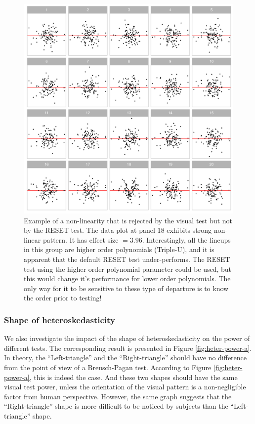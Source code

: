 \documentclass[]{interact}
\theoremstyle{plain}%
\theoremstyle{definition}
\theoremstyle{remark}
\begin{document}
\begin{figure}

{\centering \includegraphics[width=1\linewidth]{paper_comparison_files/figure-latex/poly-example-1} 

}

\caption{Example of a non-linearity that is rejected by the visual test but not by the RESET test. The data plot at panel 18 exhibits strong non-linear pattern. It has effect size $= 3.96$. Interestingly, all the lineups in this group are higher order polynomials (Triple-U), and it is apparent that the default RESET test under-performs. The RESET test using the higher order polynomial parameter could be used, but this would change it's performance for lower order polynomials. The only way for it to be sensitive to these type of departure is to know the order prior to testing!}\label{fig:poly-example}
\end{figure}

\hypertarget{shape-of-heteroskedasticity}{%
\subsubsection{Shape of
heteroskedasticity}\label{shape-of-heteroskedasticity}}

We also investigate the impact of the shape of heteroskedasticity on the
power of different tests. The corresponding result is presented in
Figure \ref{fig:heter-power-a}. In theory, the ``Left-triangle'' and the
``Right-triangle'' should have no difference from the point of view of a
Breusch-Pagan test. According to Figure \ref{fig:heter-power-a}, this is
indeed the case. And these two shapes should have the same visual test
power, unless the orientation of the visual pattern is a non-negligible
factor from human perspective. However, the same graph suggests that the
``Right-triangle'' shape is more difficult to be noticed by subjects
than the ``Left-triangle'' shape.
\end{document}
